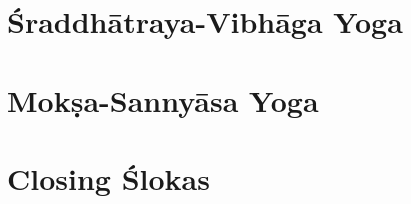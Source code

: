\documentclass{scrbook}
\begin{document}
\chapter{Śraddhātraya-Vibhāga Yoga}
\begin{multicols}{2}
    
\end{multicols}

\chapter{Mokṣa-Sannyāsa Yoga}
\begin{multicols}{2}
    
\end{multicols}

\backmatter
\chapter{Closing Ślokas}

\end{document}
